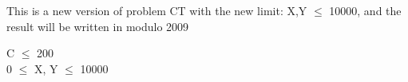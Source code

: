 This is a new version of problem CT with the new limit: X,Y $\le$ 10000, and the result will be written in modulo 2009  

C  $\le$  200   
\\   0  $\le$  X, Y  $\le$  10000